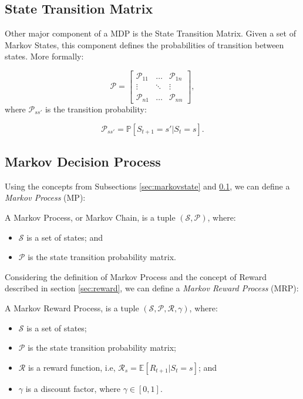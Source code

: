 \subsection{State Transition Matrix}\label{sec:statetransition}

Other major component of a MDP is the State Transition Matrix. Given a set of Markov States, this component defines the probabilities of transition between states. More formally:

\begin{equation}
\mathcal{P} = \begin{bmatrix}
\mathcal{P}_{11} &  \dots  & \mathcal{P}_{1n} \\
\vdots & \ddots & \vdots \\
\mathcal{P}_{n1} &  \dots  & \mathcal{P}_{nn} 
\end{bmatrix},
\end{equation}
where $\mathcal{P}_{ss'}$ is the transition probability:

\begin{equation}
\mathcal{P}_{ss'} = \mathbb{P}[S_{t+1} = s' | S_{t} = s].
\end{equation}

\subsection{Markov Decision Process}

Using the concepts from Subsections \ref{sec:markovstate} and \ref{sec:statetransition}, we can define a \textit{Markov Process} (MP):

\begin{definition}
	A Markov Process, or Markov Chain, is a tuple $(\mathcal{S}, \mathcal{P})$, where:
	\begin{itemize}
		\item $\mathcal{S}$ is a set of states; and
		\item $\mathcal{P}$ is the state transition probability matrix.
	\end{itemize}
\end{definition}

Considering the definition of Markov Process and the concept of Reward described in section \ref{sec:reward}, we can define a \textit{Markov Reward Process} (MRP):

\begin{definition}
	A Markov Reward Process, is a tuple $(\mathcal{S}, \mathcal{P}, \mathcal{R}, \gamma)$, where:
	\begin{itemize}
		\item $\mathcal{S}$ is a set of states; 
		\item $\mathcal{P}$ is the state transition probability matrix;
		\item $\mathcal{R}$ is a reward function, i.e, $\mathcal{R}_{s} = \mathbb{E}[R_{t+1} | S_{t} = s]$; and
		\item $\gamma$ is a discount factor, where $\gamma \in [0,1]$.
	\end{itemize}
\end{definition}

